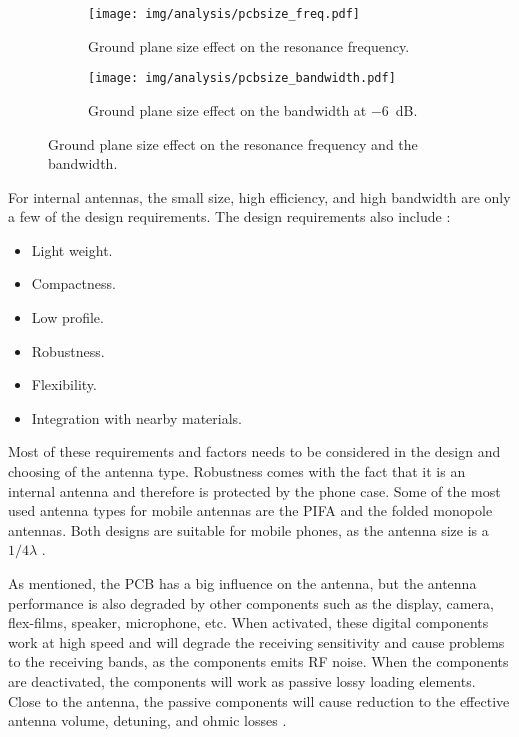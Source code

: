 \begin{figure}[htbp]
   \begin{subfigure}[b]{0.49\linewidth}
        \centering
        \texttt{[image: img/analysis/pcbsize\_freq.pdf]}
        \caption{Ground plane size effect on the resonance frequency.}
    \end{subfigure}
    \hfill
    \begin{subfigure}[b]{0.49\linewidth}
        \centering
        \texttt{[image: img/analysis/pcbsize\_bandwidth.pdf]}
        \caption{Ground plane size effect on the bandwidth at \SI{-6}{dB}.}
    \end{subfigure}
    \caption{Ground plane size effect on the resonance frequency and the bandwidth\cite{sanchez2008multiband}.}
    \label{fig:antenna_pcb_behavior}
\end{figure}

For internal antennas, the small size, high efficiency, and high bandwidth are only a few of the design requirements. The design requirements also include \cite{fujimoto2008mobile}:
\begin{itemize}
\item Light weight.
\item Compactness.
\item Low profile.
\item Robustness.
\item Flexibility.
\item Integration with nearby materials.
\end{itemize}
Most of these requirements and factors needs to be considered in the design and choosing of the antenna type. Robustness comes with the fact that it is an internal antenna and therefore is protected by the phone case. Some of the most used antenna types for mobile antennas are the PIFA and the folded monopole antennas. Both designs are suitable for mobile phones, as the antenna size is a $1/4 \lambda$ \cite{fujimoto2008mobile}.

As mentioned, the PCB has a big influence on the antenna, but the antenna performance is also degraded by other components such as the display, camera, flex-films, speaker, microphone, etc. When activated, these digital components work at high speed and will degrade the receiving sensitivity and cause problems to the receiving bands, as the components emits RF noise. When the components are deactivated, the components will work as passive lossy loading elements. Close to the antenna, the passive components will cause reduction to the effective antenna volume, detuning, and ohmic losses \cite{fujimoto2008mobile}.

